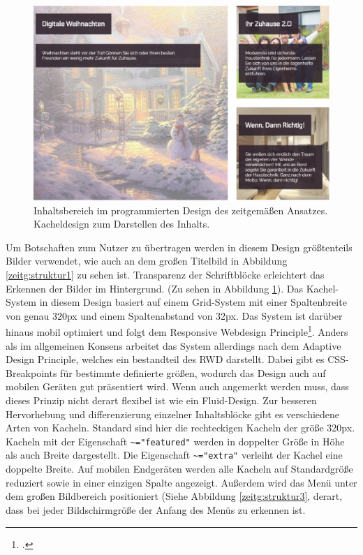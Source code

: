 \begin{figure} [hp]
	\includegraphics[width=\textwidth]{./img/zeitg_struktur2.png}
	\caption{Inhaltsbereich im programmierten Design des zeitgemäßen Ansatzes. Kacheldesign zum Darstellen des Inhalts.}
	\label{zeitg:struktur2}
\end{figure}

Um Botschaften zum Nutzer zu übertragen werden in diesem Design größtenteils Bilder verwendet, wie auch an dem großen Titelbild in Abbildung \ref{zeitg:struktur1} zu sehen ist. Transparenz der Schriftblöcke erleichtert das Erkennen der Bilder im Hintergrund. (Zu sehen in Abbildung \ref{zeitg:struktur2}).
Das Kachel-System in diesem Design basiert auf einem Grid-System mit einer Spaltenbreite von genau 320px und einem Spaltenabstand von 32px. Das System ist darüber hinaus mobil optimiert und folgt dem Responsive Webdesign Principle\footcite[vgl.][]{alistapart:rwd}. Anders als im allgemeinen Konsens arbeitet das System allerdings nach dem Adaptive Design Principle, welches ein bestandteil des RWD darstellt. Dabei gibt es CSS-Breakpoints für bestimmte definierte größen, wodurch das Design auch auf mobilen Geräten gut präsentiert wird. Wenn auch angemerkt werden muss, dass dieses Prinzip nicht derart flexibel ist wie ein Fluid-Design.
Zur besseren Hervorhebung und differenzierung einzelner Inhaltsblöcke gibt es verschiedene Arten von Kacheln. Standard sind hier die rechteckigen Kacheln der größe 320px. Kacheln mit der Eigenschaft \lstinline{~="featured"} werden in doppelter Größe in Höhe als auch Breite dargestellt. Die Eigenschaft \lstinline{~="extra"} verleiht der Kachel eine doppelte Breite.
Auf mobilen Endgeräten werden alle Kacheln auf Standardgröße reduziert sowie in einer einzigen Spalte angezeigt. Außerdem wird das Menü unter dem großen Bildbereich positioniert (Siehe Abbildung \ref{zeitg:struktur3}, derart, dass bei jeder Bildschirmgröße der Anfang des Menüs zu erkennen ist.

